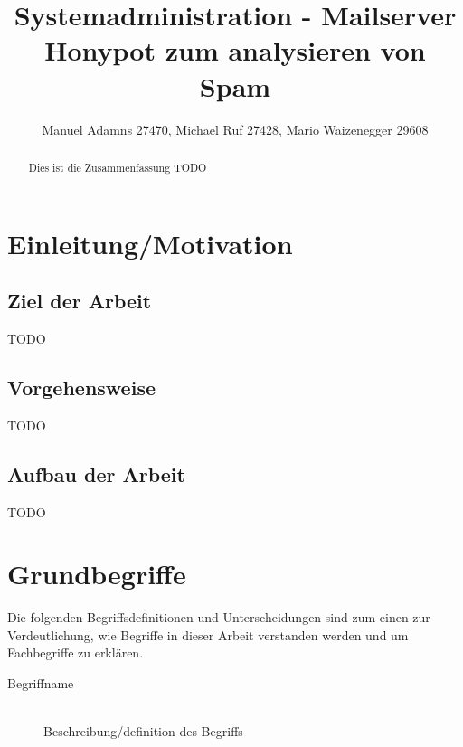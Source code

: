 \documentclass[a4paper,11pt,singlespacing]{article}
\begin{document}

\title{Systemadministration - Mailserver Honypot zum analysieren von Spam}
\author{Manuel Adamns 27470, Michael Ruf 27428, Mario Waizenegger 29608}
\maketitle
\begin{abstract}
Dies ist die Zusammenfassung TODO
\end{abstract}

\newpage

\tableofcontents

\newpage
{}

\section{Einleitung/Motivation}\label{sec:EinleitungMotivation}

	\subsection{Ziel der Arbeit}\label{Ziel}
		TODO
	
	\subsection{Vorgehensweise}\label{sec:Vorgehensweise}
		TODO

	\subsection{Aufbau der Arbeit}\label{sec:Aufbau}
		TODO


\section{Grundbegriffe}\label{sec:Grundbegriffe}
	Die folgenden Begriffsdefinitionen und Unterscheidungen sind zum einen zur Verdeutlichung, wie Begriffe in dieser Arbeit verstanden werden und um Fachbegriffe zu erklären.
	
	\begin{description}
	
	\item[Begriffname\label{itm:BegriffReferenzname}]\hfill \\
	Beschreibung/definition des Begriffs \cite{BeispielBuch}
	
	\end{description}
\end{document}
